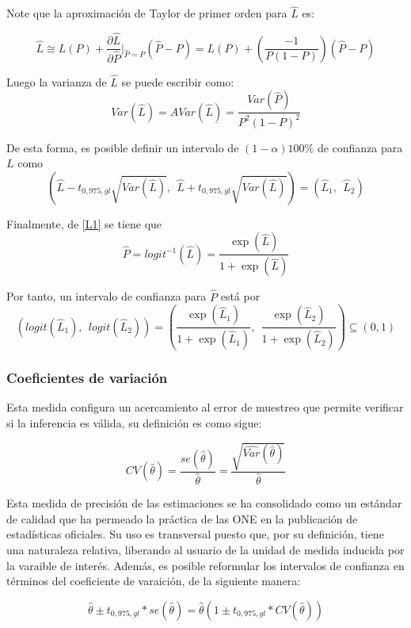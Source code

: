 \documentclass[
  10pt,
  spanish,
]{book}
\begin{document}
Note que la aproximación de Taylor de primer orden para \(\hat{L}\) es:

\[
\hat{L} \cong L(P) + \frac{\partial \hat{L}}{\partial \hat{P}}\biggr\rvert_{\hat{P}=P}(\hat{P}-P) = L(P) + \left( \dfrac{-1}{P(1-P)}\right)(\hat{P}-P)
\]

Luego la varianza de \(\hat{L}\) se puede escribir como:
\[
Var(\hat{L}) = AVar(\hat{L}) = \dfrac{Var(\hat{P})}{P^2(1-P)^2}
\]

De esta forma, es posible definir un intervalo de \((1-\alpha)100\%\) de confianza para \(L\) como
\[
\left(\hat{L} - t_{0,975, gl}\sqrt{Var(\hat{L})}, \ \
\hat{L} + t_{0,975, gl}\sqrt{Var(\hat{L})}
\right) =
(\hat{L}_1, \ \ \hat{L}_2)
\]

Finalmente, de \eqref{L1} se tiene que
\[
\hat{P} = logit^{-1}(\hat L) = \dfrac{\exp (\hat{L})}{1+\exp (\hat{L})}
\]

Por tanto, un intervalo de confianza para \(\hat{P}\) está por
\[
\left(logit(\hat{L}_1), \ \ logit(\hat{L}_2)\right) = 
\left(
\dfrac{\exp (\hat{L}_1)}{1+\exp (\hat{L}_1)}, \ \
\dfrac{\exp (\hat{L}_2)}{1+\exp (\hat{L}_2)}
\right) \subseteq (0, 1)
\]

\hypertarget{coeficientes-de-variaciuxf3n}{%
\subsubsection*{Coeficientes de variación}\label{coeficientes-de-variaciuxf3n}}

Esta medida configura un acercamiento al error de muestreo que permite verificar si la inferencia es válida, su definición es como sigue:

\[
CV(\hat\theta) = \frac{se(\hat\theta)}{\hat\theta} = \frac{\sqrt{\widehat{Var}(\hat\theta)}}{\hat\theta}
\]

Esta medida de precisión de las estimaciones se ha consolidado como un estándar de calidad que ha permeado la práctica de las ONE en la publicación de estadísticas oficiales. Su uso es transversal puesto que, por su definición, tiene una naturaleza relativa, liberando al usuario de la unidad de medida inducida por la varaible de interés. Además, es posible reformular los intervalos de confianza en términos del coeficiente de varaición, de la siguiente manera:

\[
\hat\theta \pm t_{0,975, gl} * se(\hat\theta) = \hat\theta  \left(1 \pm t_{0,975, gl} * CV(\hat\theta)\right)
\]
\end{document}
